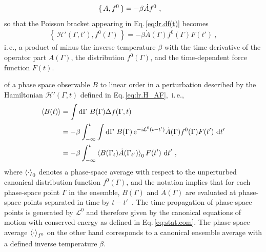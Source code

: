 \begin{align}
  \set{A, f^0}
    &= -\beta \dot A f^0~,
   \label{eq:lr.dA_dt}
\end{align}
so that the Poisson bracket %
appearing in Eq.\,\eqref{eq:lr.df(t)} becomes
\begin{align}
	\left\{\, \mathcal  H' (\Gamma, t'), f^0 (\Gamma) \,\right\}
		= - \beta \dot{A} (\Gamma) f^0 (\Gamma) F(t')~,
	\label{eq:.lr.poisson.H'}
\end{align}
i.\,e., a product of minus the inverse temperature $\beta$ with the time derivative of the operator part $\dot A (\Gamma)$, the distribution $f^0 (\Gamma)$, and the time-dependent force function $F (t)$.

 of a phase space observable $B$ to linear order in a perturbation described by the Hamiltonian $\mathcal H'(\Gamma, t)$ defined in Eq.\,\eqref{eq:lr.H_AF},~i.\,e.,~
\begin{align}
\braket{B (t)}
    &= \int \d \Gamma ~  B (\Gamma) \Delta f (\Gamma, t) \\
    &= - \beta \int_{-\infty}^t 
      \int \d \Gamma ~  
       B (\Gamma) \, {\rm e}^{-\im \mathcal L^0 (t - t')} \dot{A}(\Gamma)
       f^0(\Gamma) F(t') ~ \d t' \\
    &= - \beta \int_{-\infty}^t 
      \braket{B(\Gamma_t) \dot{A} (\Gamma_{t'})}_{0} F(t') ~ \d t'~,
  \label{eq:lr.dB}
\end{align}
where $\braket{\cdot}_{0}$ denotes a phase-space average with respect to the unperturbed canonical distribution function $f^0 (\Gamma)$, and the notation implies that for each phase-space point $\Gamma$ in the ensemble, $B (\Gamma)$ and $\dot{A} (\Gamma)$ are evaluated at phase-space points separated in time by $t-t'$~\cite[p.\,498]{Tuckerman}.
The time propagation of phase-space points is generated by $\mathcal L^0$ and therefore given by the canonical equations of motion with conserved energy as defined in Eq.\,\eqref{eq:stat.eom}. The phase-space average $\braket{\cdot}_{f^0}$ on the other hand corresponds to a canonical ensemble average with a defined inverse temperature $\beta$.

